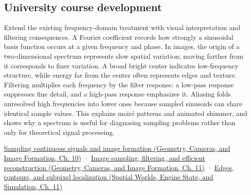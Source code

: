 \subsection{University course development}\label{appendix-b60686ba06a1-university-course-development}

\hypertarget{appendix-b60686ba06a1-university-course-development}{}

Extend the existing frequency-domain treatment with visual interpretation and filtering consequences. A Fourier coefficient records how strongly a sinusoidal basis function occurs at a given frequency and phase. In images, the origin of a two-dimensional spectrum represents slow spatial variation; moving farther from it corresponds to finer variation. A broad bright center indicates low-frequency structure, while energy far from the center often represents edges and texture. Filtering multiplies each frequency by the filter response: a low-pass response suppresses fine detail, and a high-pass response emphasizes it. Aliasing folds unresolved high frequencies into lower ones because sampled sinusoids can share identical sample values. This explains moiré patterns and animated shimmer, and shows why a spectrum is useful for diagnosing sampling problems rather than only for theoretical signal processing.

\href{../03-Geometry-Cameras-and-Image-Formation/main.pdf\#nameddest=03-visual-computing-i-ch003-sampling-continuous-signals-and-image-formation}{Sampling continuous signals and image formation (Geometry, Cameras, and Image Formation, Ch. 10)} · \href{../03-Geometry-Cameras-and-Image-Formation/main.pdf\#nameddest=03-visual-computing-i-ch004-image-sampling-filtering-and-efficient-reconstruction}{Image sampling, filtering, and efficient reconstruction (Geometry, Cameras, and Image Formation, Ch. 11)} · \href{../05-Spatial-Worlds-Engine-State-and-Simulation/main.pdf\#nameddest=04-visual-computing-ii-ch030-edges-contours-and-subpixel-localization}{Edges, contours, and subpixel localization (Spatial Worlds, Engine State, and Simulation, Ch. 11)}
